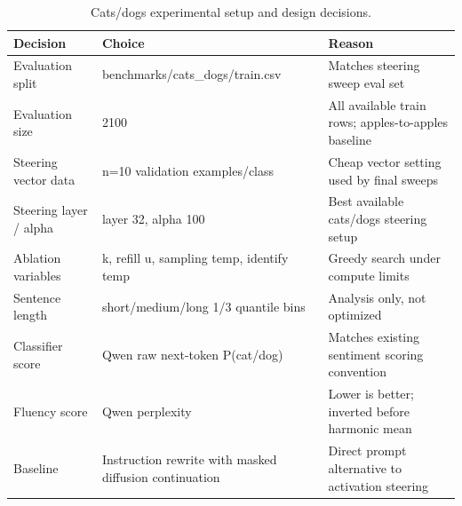 \begin{table}[t]
\centering
\small
\begin{tabular}{lll}
\toprule
Decision & Choice & Reason \\
\midrule
Evaluation split & benchmarks/cats\_dogs/train.csv & Matches steering sweep eval set \\
Evaluation size & 2100 & All available train rows; apples-to-apples baseline \\
Steering vector data & n=10 validation examples/class & Cheap vector setting used by final sweeps \\
Steering layer / alpha & layer 32, alpha 100 & Best available cats/dogs steering setup \\
Ablation variables & k, refill u, sampling temp, identify temp & Greedy search under compute limits \\
Sentence length & short/medium/long 1/3 quantile bins & Analysis only, not optimized \\
Classifier score & Qwen raw next-token P(cat/dog) & Matches existing sentiment scoring convention \\
Fluency score & Qwen perplexity & Lower is better; inverted before harmonic mean \\
Baseline & Instruction rewrite with masked diffusion continuation & Direct prompt alternative to activation steering \\
\bottomrule
\end{tabular}
\caption{Cats/dogs experimental setup and design decisions.}
\label{tab:cats-dogs-setup}
\end{table}
